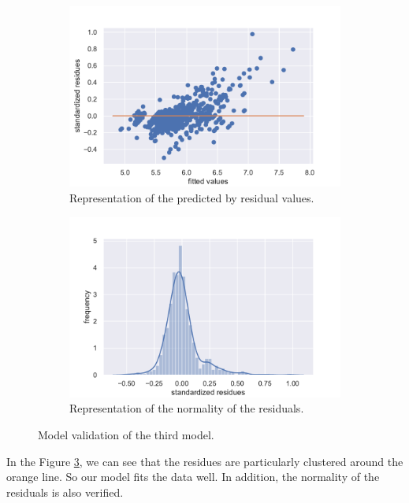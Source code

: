 \documentclass{article}
\begin{document}
\begin{figure}[H]
\centering
\begin{subfigure}{.5\textwidth}
  \centering
  \includegraphics[width=1\linewidth]{./images/homo_mod3.pdf}
  \caption{Representation of the predicted by residual values.}
  \label{fig:homo_mod3}
\end{subfigure}%
\begin{subfigure}{.5\textwidth}
  \centering
  \includegraphics[width=1\linewidth, clip,trim={0cm 0cm 0cm 0.6cm} ]{./images/resid_norm_m3.pdf}
  \caption{Representation of the normality of the residuals.}
  \label{fig:resid3}
\end{subfigure}
\caption{Model validation of the third model.}
\label{fig:valid_3}
\end{figure}

In the Figure \ref{fig:valid_3}, we can see that the residues are particularly clustered around the orange line. So our model fits the data well. In addition, the normality of the residuals is also verified.
\end{document}
